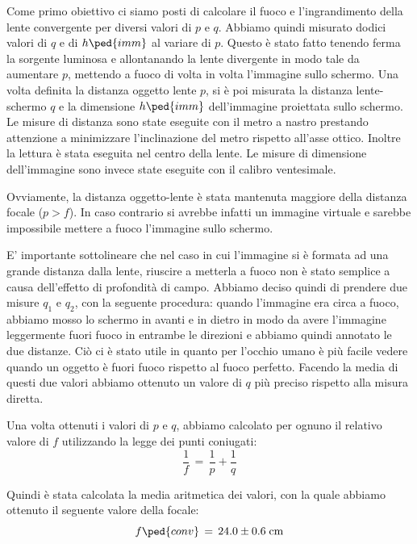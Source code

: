 Come primo obiettivo ci siamo posti di calcolare il fuoco e l'ingrandimento della lente convergente per diversi valori di $p$ e $q$. Abbiamo quindi misurato dodici valori di $q$ e di $h\ped{imm}$ al variare di $p$.
Questo è stato fatto tenendo ferma la sorgente luminosa e allontanando la lente divergente in modo tale da aumentare $p$, mettendo a fuoco di volta in volta l'immagine sullo schermo. %
Una volta definita la distanza oggetto lente $p$, si è poi misurata la distanza lente-schermo $q$ e la dimensione $h\ped{imm}$ dell'immagine proiettata sullo schermo. Le misure di distanza sono state eseguite con il metro a nastro prestando attenzione a minimizzare l'inclinazione del metro rispetto all'asse ottico. Inoltre la lettura è stata eseguita nel centro della lente. Le misure di dimensione dell'immagine sono invece state eseguite con il calibro ventesimale.

Ovviamente, la distanza oggetto-lente è stata mantenuta maggiore della distanza focale ($p > f$). In caso contrario si avrebbe infatti un immagine virtuale e sarebbe impossibile mettere a fuoco l'immagine sullo schermo.

E' importante sottolineare che nel caso in cui l'immagine si è formata ad una grande distanza dalla lente, riuscire a metterla a fuoco non è stato semplice a causa dell'effetto di profondità di campo. Abbiamo deciso quindi di prendere due misure $q_1$ e $q_2$, con la seguente procedura: quando l'immagine era circa a fuoco, abbiamo mosso lo schermo in avanti e in dietro in modo da avere l'immagine leggermente fuori fuoco in entrambe le direzioni e abbiamo quindi annotato le due distanze. Ciò ci è stato utile in quanto per l'occhio umano è più facile vedere quando un oggetto è fuori fuoco rispetto al fuoco perfetto. Facendo la media di questi due valori abbiamo ottenuto un valore di $q$ %
più preciso rispetto alla misura diretta.

Una volta ottenuti i valori  di $p$ e $q$, abbiamo calcolato per ognuno il relativo valore di $f$ utilizzando la legge dei punti coniugati:
\begin{equation}
	\frac{1}{f} \,=\, \frac{1}{p} + \frac{1}{q}
	\label{eq:coniugati}
\end{equation}

Quindi è stata calcolata la media aritmetica dei valori, con la quale abbiamo ottenuto il seguente valore della focale:
\begin{equation}
    f \ped{conv} \,=\, 24.0 \pm 0.6 \; \si{\centi\metre}
\end{equation}

